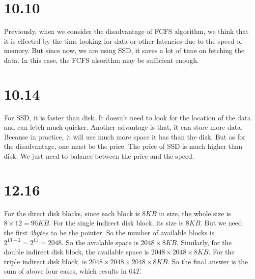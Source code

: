 \documentclass{article}
\begin{document}
    \section{10.10}
	Previously, when we consider the disadvantage of FCFS algorithm, we think that it is effected by the time looking for data or other latencies due to the speed of memory. But since now, we are using SSD, it saves a lot of time on fetching the data. In this case, the FCFS alsorithm may be sufficient enough.

    \section{10.14}
	For SSD, it is faster than disk. It doesn't need to look for the location of the data and can fetch much quicker. Another advantage is that, it can store more data. Because in practice, it will use much more space it has than the disk.
	\newline
	But as for the disadvantage, one must be the price. The price of SSD is much higher than disk. We just need to balance between the price and the speed.

    \section{12.16}
	For the direct disk blocks, since each block is $8KB$ in size, the whole size is $8 \times 12 = 96 KB$. \newline
	For the single indirect disk block, its size is $8KB$. But we need the first $4 bytes$ to be the pointer. So the number of available blocks is $2^{13 - 2} = 2^11 = 2048$. So the available space is $2048 \times 8 KB$. \newline
	Similarly, for the double indirect disk block, the available space is $2048 \times 2048 \times 8 KB$. For the triple indirect disk block, is $2048 \times 2048 \times 2048 \times 8KB$. \newline
	So the final answer is the sum of above four cases, which results in $64T$.
\end{document}
